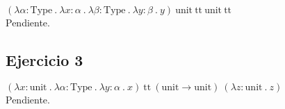 \documentclass[a4paper]{article}
\begin{document}
$(\lambda \alpha : \text{Type}\ .\
  \lambda x : \alpha\ .\
  \lambda \beta : \text{Type}\ .\
  \lambda y : \beta\ .\
  y)\
 \text{unit}\ \text{tt}\ \text{unit}\ \text{tt}$\\

Pendiente.

\subsection{Ejercicio 3}

$(\lambda x : \text{unit}\ .\
  \lambda \alpha : \text{Type}\ .\
  \lambda y : \alpha\ .\
  x)\
 \text{tt}\ (\text{unit} \rightarrow \text{unit})\
 (\lambda z : \text{unit}\ .\
  z)$\\

Pendiente.
\end{document}
